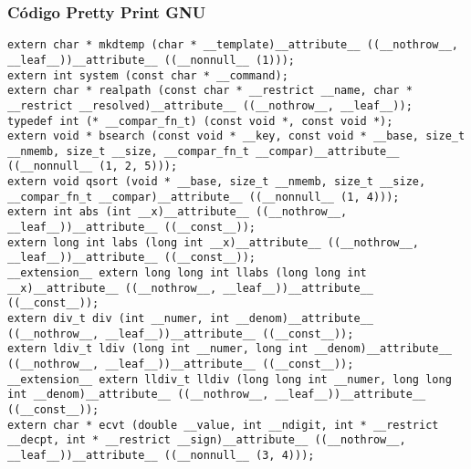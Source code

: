 \documentclass{beamer}
\begin{document}
\begin{frame}[fragile]
\frametitle{C\'odigo Pretty Print GNU}
\begin{verbatim}
extern char * mkdtemp (char * __template)__attribute__ ((__nothrow__, __leaf__))__attribute__ ((__nonnull__ (1)));
extern int system (const char * __command);
extern char * realpath (const char * __restrict __name, char * __restrict __resolved)__attribute__ ((__nothrow__, __leaf__));
typedef int (* __compar_fn_t) (const void *, const void *);
extern void * bsearch (const void * __key, const void * __base, size_t __nmemb, size_t __size, __compar_fn_t __compar)__attribute__ ((__nonnull__ (1, 2, 5)));
extern void qsort (void * __base, size_t __nmemb, size_t __size, __compar_fn_t __compar)__attribute__ ((__nonnull__ (1, 4)));
extern int abs (int __x)__attribute__ ((__nothrow__, __leaf__))__attribute__ ((__const__));
extern long int labs (long int __x)__attribute__ ((__nothrow__, __leaf__))__attribute__ ((__const__));
__extension__ extern long long int llabs (long long int __x)__attribute__ ((__nothrow__, __leaf__))__attribute__ ((__const__));
extern div_t div (int __numer, int __denom)__attribute__ ((__nothrow__, __leaf__))__attribute__ ((__const__));
extern ldiv_t ldiv (long int __numer, long int __denom)__attribute__ ((__nothrow__, __leaf__))__attribute__ ((__const__));
__extension__ extern lldiv_t lldiv (long long int __numer, long long int __denom)__attribute__ ((__nothrow__, __leaf__))__attribute__ ((__const__));
extern char * ecvt (double __value, int __ndigit, int * __restrict __decpt, int * __restrict __sign)__attribute__ ((__nothrow__, __leaf__))__attribute__ ((__nonnull__ (3, 4)));
\end{verbatim}
\end{frame}
\end{document}

